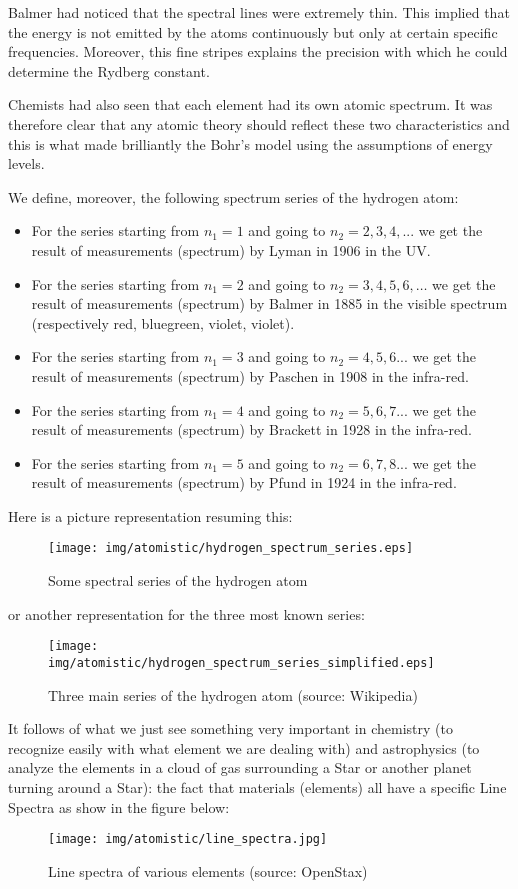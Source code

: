 Balmer had noticed that the spectral lines were extremely thin. This implied that the energy is not emitted by the atoms continuously but only at certain specific frequencies. Moreover, this fine stripes explains the precision with which he could determine the Rydberg constant.

Chemists had also seen that each element had its own atomic spectrum. It was therefore clear that any atomic theory should reflect these two characteristics and this is what made brilliantly the Bohr's model using the assumptions of energy levels.

We define, moreover, the following spectrum series of the hydrogen atom:

	\begin{itemize}
		\item For the series starting from $n_1=1$ and going to $n_2=2,3,4,...$  we get the result of measurements (spectrum) by Lyman in 1906 in the UV.
		
		\item For the series starting from $n_1=2$ and going to $n_2=3,4,5,6,\ldots$  we get the result of measurements (spectrum) by Balmer in 1885 in the visible spectrum (respectively red, bluegreen, violet, violet).
		
		\item For the series starting from $n_1=3$ and going to $n_2=4,5,6...$  we get the result of measurements (spectrum) by Paschen in 1908 in the infra-red.
		
		\item For the series starting from $n_1=4$ and going to $n_2=5,6,7...$  we get the result of measurements (spectrum) by Brackett in 1928 in the infra-red.
		
		\item For the series starting from $n_1=5$ and going to $n_2=6,7,8...$  we get the result of measurements (spectrum) by Pfund in 1924 in the infra-red.
	\end{itemize}
	Here is a picture representation resuming this:
	\begin{figure}[H]
		\centering
		\texttt{[image: img/atomistic/hydrogen\_spectrum\_series.eps]}
		\caption{Some spectral series of the hydrogen atom}
	\end{figure}
	or another representation for the three most known series:
	\begin{figure}[H]
		\centering
		\texttt{[image: img/atomistic/hydrogen\_spectrum\_series\_simplified.eps]}
		\caption{Three main series of the hydrogen atom (source: Wikipedia)}
	\end{figure}
	It follows of what we just see something very important in chemistry (to recognize easily with what element we are dealing with) and astrophysics (to analyze the elements in a cloud of gas surrounding a Star or another planet turning around a Star): the fact that materials (elements) all have a specific Line Spectra as show in the figure below:
	\begin{figure}[H]
		\centering
		\texttt{[image: img/atomistic/line\_spectra.jpg]}
		\caption{Line spectra of various elements (source: OpenStax)}
	\end{figure}


